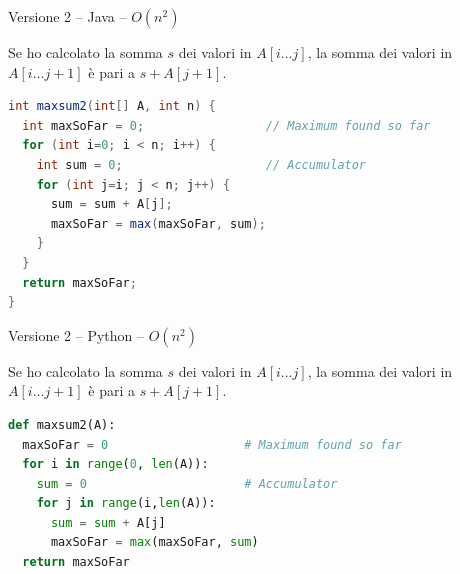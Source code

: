 \begin{frame}[fragile]{Versione 2 -- Java -- $O(n^2)$}

\vspace{-9pt}
\begin{myboxtitle}[Ottimizzazione]
Se ho calcolato la somma $s$ dei valori in $A[i \ldots j]$, la somma
dei valori in $A[i \ldots j+1]$ è pari a $s+A[j+1]$. 
\end{myboxtitle}



\vspace{-9pt}
\begin{lstlisting}[language=java]
int maxsum2(int[] A, int n) {
  int maxSoFar = 0;                 // Maximum found so far
  for (int i=0; i < n; i++) {
    int sum = 0;                    // Accumulator
    for (int j=i; j < n; j++) {
      sum = sum + A[j];
      maxSoFar = max(maxSoFar, sum);
    }
  }
  return maxSoFar;
}
\end{lstlisting}

\end{frame}


\begin{frame}[fragile]{Versione 2 -- Python -- $O(n^2)$}

\vspace{-9pt}
\begin{myboxtitle}[Ottimizzazione]
Se ho calcolato la somma $s$ dei valori in $A[i \ldots j]$, la somma
dei valori in $A[i \ldots j+1]$ è pari a $s+A[j+1]$. 
\end{myboxtitle}

\vspace{-9pt}
\begin{lstlisting}[language=python]
def maxsum2(A):
  maxSoFar = 0                   # Maximum found so far
  for i in range(0, len(A)):
    sum = 0                      # Accumulator
    for j in range(i,len(A)):
      sum = sum + A[j]
      maxSoFar = max(maxSoFar, sum)
  return maxSoFar
\end{lstlisting}


\end{frame}


